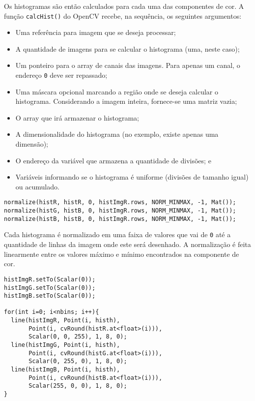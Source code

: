 \documentclass[11pt]{amsbook}
\begin{document}
Os histogramas são então calculados para cada uma das componentes
de cor. A função \texttt{calcHist()} do OpenCV recebe, na sequência, os
seguintes argumentos:


\begin{itemize}

\item Uma referência para imagem que se deseja processar;

\item A quantidade de imagens para se calcular o histograma (uma, neste
caso);

\item Um ponteiro para o array de canais das imagens. Para apenas um
canal, o endereço \texttt{0} deve ser repassado;

\item Uma máscara opcional marcando a região onde se deseja calcular o
histograma. Considerando a imagem inteira, fornece-se uma matriz
vazia;

\item O array que irá armazenar o histograma;

\item A dimensionalidade do histograma (no exemplo, existe apenas uma
dimensão);

\item O endereço da variável que armazena a quantidade de divisões; e

\item Variáveis informando se o histograma é uniforme (divisões de tamanho
igual) ou acumulado.

\end{itemize}


\begin{verbatim}
normalize(histR, histR, 0, histImgR.rows, NORM_MINMAX, -1, Mat());
normalize(histG, histB, 0, histImgR.rows, NORM_MINMAX, -1, Mat());
normalize(histB, histB, 0, histImgR.rows, NORM_MINMAX, -1, Mat());
\end{verbatim}

Cada histograma é normalizado em uma faixa de valores que vai de \texttt{0}
até a quantidade de linhas da imagem onde este será desenhado. A
normalização é feita linearmente entre os valores máximo e mínimo
encontrados na componente de cor.


\begin{verbatim}
histImgR.setTo(Scalar(0));
histImgG.setTo(Scalar(0));
histImgB.setTo(Scalar(0));

for(int i=0; i<nbins; i++){
  line(histImgR, Point(i, histh),
       Point(i, cvRound(histR.at<float>(i))),
       Scalar(0, 0, 255), 1, 8, 0);
  line(histImgG, Point(i, histh),
       Point(i, cvRound(histG.at<float>(i))),
       Scalar(0, 255, 0), 1, 8, 0);
  line(histImgB, Point(i, histh),
       Point(i, cvRound(histB.at<float>(i))),
       Scalar(255, 0, 0), 1, 8, 0);
}
\end{verbatim}
\end{document}
